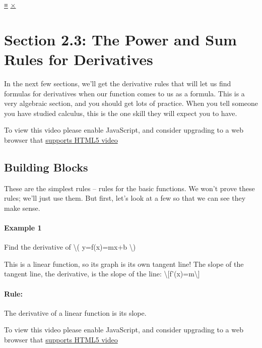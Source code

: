 \protect\hyperlink{main-nav}{≡} \protect\hyperlink{close-nav}{×}

\hypertarget{section-2.3-the-power-and-sum-rules-for-derivatives}{%
\section{Section 2.3: The Power and Sum Rules for
Derivatives}\label{section-2.3-the-power-and-sum-rules-for-derivatives}}

In the next few sections, we'll get the derivative rules that will let
us find formulas for derivatives when our function comes to us as a
formula. This is a very algebraic section, and you should get lots of
practice. When you tell someone you have studied calculus, this is the
one skill they will expect you to have.

To view this video please enable JavaScript, and consider upgrading to a
web browser that \href{http://videojs.com/html5-video-support/}{supports
HTML5 video}

\hypertarget{building-blocks}{%
\subsection{Building Blocks}\label{building-blocks}}

These are the simplest rules -- rules for the basic functions. We won't
prove these rules; we'll just use them. But first, let's look at a few
so that we can see they make sense.

\hypertarget{example-1}{%
\paragraph{Example 1}\label{example-1}}

Find the derivative of \textbackslash{}( y=f(x)=mx+b \textbackslash{})

This is a linear function, so its graph is its own tangent line! The
slope of the tangent line, the derivative, is the slope of the line:
\textbackslash{}{[}f'(x)=m\textbackslash{}{]}

\hypertarget{rule}{%
\paragraph{Rule:}\label{rule}}

The derivative of a linear function is its slope.

To view this video please enable JavaScript, and consider upgrading to a
web browser that \href{http://videojs.com/html5-video-support/}{supports
HTML5 video}

